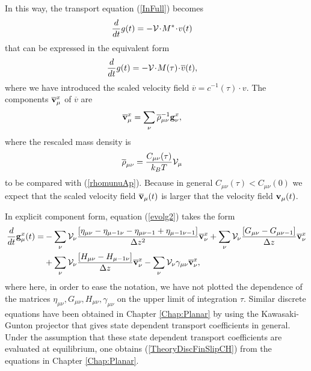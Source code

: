 \documentclass[b5paper,openright,10pt]{book}
\newcommand{\esc}{\!\cdot\!}
\begin{document}
In this way, the transport equation (\ref{InFull}) becomes
\begin{align}
 \frac{d}{dt}g(t)&= - {\cal V}\esc M^*\esc v(t) 
\label{InFullVel}
\end{align}
that can be  expressed in the equivalent form
\begin{align}
   \frac{d}{dt}g(t)&=  - {\cal V}\esc M(\tau)\esc \overline{v}(t),
\label{InFullVel2}
\end{align}
where  we  have introduced  the  scaled  velocity field  $\overline{v}
=c^{-1}(\tau)\esc  v$.   The  components $\overline{\bf  v}^x_\mu$  of
$\overline{v}$ are
\begin{align}
  \overline{\bf v}^x_\mu&=\sum_{\nu}\overline{\rho}_{\mu\nu}^{-1}{\bf g}^x_\nu,
\label{ov}
\end{align}
where the rescaled mass density is 
\begin{align}
  \overline{\rho}_{\mu\nu}&=\frac{C_{\mu\nu}(\tau)}{k_BT}  {\cal V}_\mu
\end{align}
to   be   compared   with    (\ref{rhomunuAp}).   Because   in   general
$C_{\mu\nu}(\tau)<C_{\mu\nu}(0)$  we expect  that the  scaled velocity
field  $\overline{\bf v}_\mu(t)$  is  larger that  the velocity  field
${\bf v}_\mu(t)$. 



In explicit component form,  equation (\ref{evolg2}) takes the form
\begin{align}
  \frac{d}{dt}{\bf g}^x_\mu(t)=&
-\sum_{\nu} {\cal V}_\nu \frac{\left[\eta_{\mu\nu}-\eta_{\mu-1\nu}-\eta_{\mu\nu-1}+\eta_{\mu-1\nu-1}\right]}{\Delta z^2}\overline{\bf v}^x_\nu
+\sum_{\nu} {\cal V}_\nu\frac{\left[G_{\mu\nu}-G_{\mu\nu-1}\right]}{\Delta z}\overline{\bf v}^x_\nu
\nonumber\\
&+\sum_{\nu} {\cal V}_\nu\frac{\left[H_{\mu\nu}-H_{\mu-1\nu}\right]}{\Delta z}
\overline{\bf v}^x_\nu
-\sum_{\nu} {\cal V}_\nu\gamma_{\mu\nu}\overline{\bf v}^x_\nu,
\label{TheoryDiscFinSlipCH}
\end{align}
where here,  in order to  ease the notation,  we have not  plotted the
dependence                of               the                matrices
$\eta_{\mu\nu},G_{\mu\nu},H_{\mu\nu},\gamma_{\mu\nu}$  on   the  upper
limit  of integration  $\tau$. Similar  discrete equations  have been
obtained in Chapter \ref{Chap:Planar}
by  using the Kawasaki-Gunton projector that
gives state  dependent transport coefficients in  general.  Under the
assumption  that  these  state dependent  transport  coefficients  are
evaluated at  equilibrium, one obtains (\ref{TheoryDiscFinSlipCH})  from the
equations in Chapter \ref{Chap:Planar}.
\end{document}
